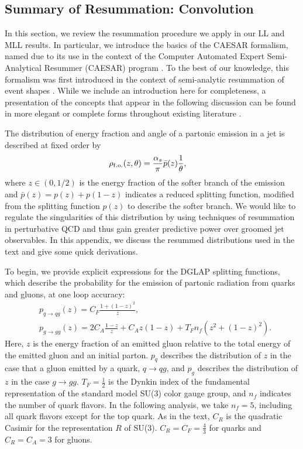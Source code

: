 \documentclass[letterpaper,11pt]{article}
\begin{document}
\subsection{Summary of Resummation: Convolution}
\label{app:caesar_basics}
In this section, we review the resummation procedure we apply in our LL and MLL results.
%
In particular, we introduce the basics of the CAESAR formalism, named due to its use in the context of the Computer Automated Expert Semi-Analytical Resummer (CAESAR) program \cite{Banfi:2004yd}.
%
To the best of our knowledge, this formalism was first introduced in the context of semi-analytic resummation of event shapes \cite{Banfi:2001bz}.
%
While we include an introduction here for completeness, a presentation of the concepts that appear in the following discussion can be found in more elegant or complete forms throughout existing literature \cite{Larkoski:2017fip, Larkoski:2021aav, Cohen:2020afv, Banfi:2001bz, Banfi:2004yd, Banfi:2004nk, Banfi:2010xy, Luisoni:2015xha, Bauer:2018svx, Baron:2020xoi}.

The distribution of energy fraction and angle of a partonic emission in a jet is described at fixed order by
%
\begin{align}
    \rho_{\rm f.o.}(z,\theta)
    &=
    \frac{\alpha_s}{\pi} \bar{p}(z) \frac{1}{\theta}
    ,
\end{align}
where \(z\in(0, 1/2)\) is the energy fraction of the softer branch of the emission and \(\bar{p}(z) = p(z) + p(1-z)\) indicates a reduced splitting function, modified from the splitting function \(p(z)\) to describe the softer branch.
%
We would like to regulate the singularities of this distribution by using techniques of resummation in perturbative QCD and thus gain greater predictive power over groomed jet observables.
%
In this appendix, we discuss the resummed distributions used in the text and give some quick derivations.

To begin, we provide explicit expressions for the DGLAP splitting functions, which describe the probability for the emission of partonic radiation from quarks and gluons, at one loop accuracy:
%
\begin{align}
&p_{q\to q g}(z) = C_F \frac{1+(1-z)^2}{z},
\label{eqn:quark_splitting}
\\
&p_{g\to g g}(z) = 2C_A\frac{1-z}{z} + C_A z(1-z) + T_F n_f (z^2 + (1-z)^2).
\label{eqn:gluon_splitting}
\end{align}
%
Here, \(z\) is the energy fraction of an emitted gluon relative to the total energy of the emitted gluon and an initial parton.
%
\(p_q\) describes the distribution of \(z\) in the case that a gluon emitted by a quark, \(q \to q g\), and \(p_g\) describes the distribution of \(z\) in the case \(g \to gg\).
%
\(T_F = \frac{1}{2}\) is the Dynkin index of the fundamental representation of the standard model SU(3) color gauge group, and \(n_f\) indicates the number of quark flavors.
%
In the following analysis, we take \(n_f = 5\), including all quark flavors except for the top quark.
%
As in the text, \(C_R\) is the quadratic Casimir for the representation \(R\) of SU(3).
%
\(C_R = C_F = \frac{4}{3}\) for quarks and \(C_R = C_A = 3\) for gluons.
\end{document}
